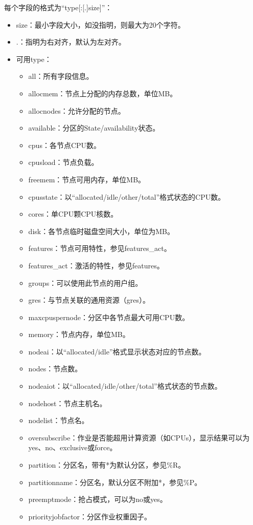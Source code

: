 \begin{itemize}
每个字段的格式为``type[:[.]size]''：
\begin{itemize}
	\item size：最小字段大小，如没指明，则最大为20个字符。
    \item .：指明为右对齐，默认为左对齐。
	\item 可用type：
\begin{itemize}
   	\item all：所有字段信息。
   	\item allocmem：节点上分配的内存总数，单位MB。
   	\item allocnodes：允许分配的节点。
   	\item available：分区的State/availability状态。
   	\item cpus：各节点CPU数。
   	\item cpusload：节点负载。
   	\item freemem：节点可用内存，单位MB。
   	\item cpusstate：以``allocated/idle/other/total''格式状态的CPU数。
   	\item cores：单CPU颗CPU核数。
   	\item disk：各节点临时磁盘空间大小，单位为MB。
   	\item features：节点可用特性，参见features\_act。
   	\item features\_act：激活的特性，参见features。
   	\item groups：可以使用此节点的用户组。
   	\item gres：与节点关联的通用资源（gres）。
   	\item maxcpuspernode：分区中各节点最大可用CPU数。
   	\item memory：节点内存，单位MB。
   	\item nodeai：以``allocated/idle''格式显示状态对应的节点数。
   	\item nodes：节点数。
   	\item nodeaiot：以``allocated/idle/other/total''格式状态的节点数。
   	\item nodehost：节点主机名。
   	\item nodelist：节点名。
   	\item oversubscribe：作业是否能超用计算资源（如CPUs），显示结果可以为yes、no、exclusive或force。
   	\item partition：分区名，带有*为默认分区，参见\%R。
   	\item partitionname：分区名，默认分区不附加*，参见\%P。
   	\item preemptmode：抢占模式，可以为no或yes。
   	\item priorityjobfactor：分区作业权重因子。

\end{itemize}
\end{itemize}
\end{itemize}
